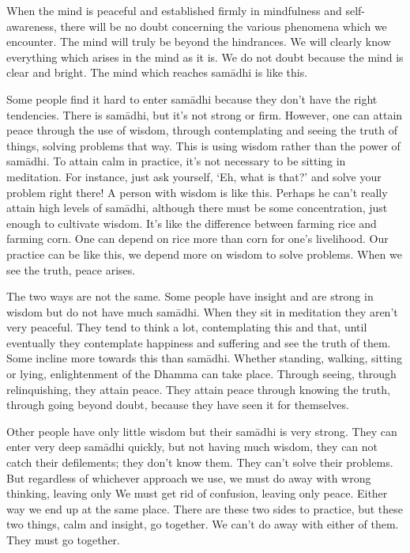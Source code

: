 When the mind is peaceful and established firmly in mindfulness and self-awareness, there will be no doubt concerning the various phenomena which we encounter. The mind will truly be beyond the hindrances. We will clearly know everything which arises in the mind as it is. We do not doubt because the mind is clear and bright. The mind which reaches sam\=adhi is like this.

Some people find it hard to enter sam\=adhi because they don't have the right tendencies. There is sam\=adhi, but it's not strong or firm. However, one can attain peace through the use of wisdom, through contemplating and seeing the truth of things, solving problems that way. This is using wisdom rather than the power of sam\=adhi. To attain calm in practice, it's not necessary to be sitting in meditation. For instance, just ask yourself, `Eh, what is that?' and solve your problem right there! A person with wisdom is like this. Perhaps he can't really attain high levels of sam\=adhi, although there must be some concentration, just enough to cultivate wisdom. It's like the difference between farming rice and farming corn. One can depend on rice more than corn for one's livelihood. Our practice can be like this, we depend more on wisdom to solve problems. When we see the truth, peace arises.

The two ways are not the same. Some people have insight and are strong in wisdom but do not have much sam\=adhi. When they sit in meditation they aren't very peaceful. They tend to think a lot, contemplating this and that, until eventually they contemplate happiness and suffering and see the truth of them. Some incline more towards this than sam\=adhi. Whether standing, walking, sitting or lying, enlightenment of the Dhamma can take place. Through seeing, through relinquishing, they attain peace. They attain peace through knowing the truth, through going beyond doubt, because they have seen it for themselves.

Other people have only little wisdom but their sam\=adhi is very strong. They can enter very deep sam\=adhi quickly, but not having much wisdom, they can not catch their defilements; they don't know them. They can't solve their problems. But regardless of whichever approach we use, we must do away with wrong thinking, leaving only  We must get rid of confusion, leaving only peace. Either way we end up at the same place. There are these two sides to practice, but these two things, calm and insight, go together. We can't do away with either of them. They must go together.

